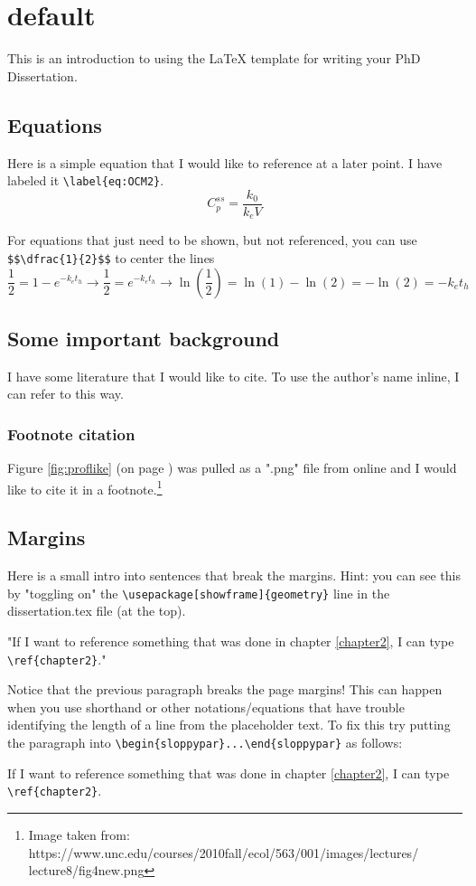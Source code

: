 \chapter{default}

This is an introduction to using the \LaTeX \xspace template for writing your PhD Dissertation.

\section{Equations}

Here is a simple equation that I would like to reference at a later point. I have labeled it \verb+\label{eq:OCM2}+.
\begin{equation} \label{eq:OCM2}
C_{p}^{ss}=\dfrac{k_0}{k_{e}V}
\end{equation}

For equations that just need to be shown, but not referenced, you can use \verb+$$\dfrac{1}{2}$$+ to center the lines
$$\dfrac{1}{2}=1-e^{-k_{e}t_{h}}\longrightarrow\frac{1}{2}=e^{-k_{e}t_{h}}\longrightarrow\ln⁡{(\dfrac{1}{2})}=\ln{(1)}-\ln{(2)}=-\ln{(2)}=-k_{e}t_{h}$$

\section{Some important background}
I have some literature that I would like to cite.\citep{Cole2014,Venzon1988,Murphy2000,Sprott2000} To use the author's name inline, I can refer to \citet{Cox1992} this way. 

\subsection{Footnote citation}
Figure \ref{fig:proflike} (on page \pageref{fig:proflike}) was pulled as a ".png" file from online and I would like to cite it in a footnote.\footnote{Image taken from: https://www.unc.edu/courses/2010fall/ecol/563/001/images/lectures/\\lecture8/fig4new.png}

\section{Margins} \label{ch1:Description}
Here is a small intro into sentences that break the margins. Hint: you can see this by "toggling on" the \verb+\usepackage[showframe]{geometry}+ line in the dissertation.tex file (at the top).

"If I want to reference something that was done in chapter \ref{chapter2}, I can type \verb+\ref{chapter2}+."

Notice that the previous paragraph breaks the page margins! This can happen when you use shorthand or other notations/equations that have trouble identifying the length of a line from the placeholder text. To fix this try putting the paragraph into \verb+\begin{sloppypar}...\end{sloppypar}+ as follows:

\begin{sloppypar}
If I want to reference something that was done in chapter \ref{chapter2}, I can type \verb+\ref{chapter2}+. 
\end{sloppypar}
